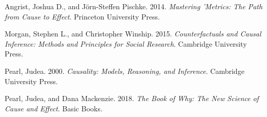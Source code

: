 \documentclass[
]{scrartcl}
\newlength{\cslhangindent}
\newenvironment{CSLReferences}[2] %
 {\begin{list}{}{%
  \setlength{\itemindent}{0pt}
  \setlength{\leftmargin}{0pt}
  \setlength{\parsep}{0pt}
  \ifodd #1
   \setlength{\leftmargin}{\cslhangindent}
   \setlength{\itemindent}{-1\cslhangindent}
  \fi
  \setlength{\itemsep}{#2\baselineskip}}}
 {\end{list}}
\begin{document}
\label{refs}
\begin{CSLReferences}{1}{0}
Angrist, Joshua D., and Jörn-Steffen Pischke. 2014. \emph{Mastering
'{Metrics}: {The Path} from {Cause} to {Effect}}. Princeton University
Press.

Morgan, Stephen L., and Christopher Winship. 2015. \emph{Counterfactuals
and {Causal Inference}: {Methods} and {Principles} for {Social
Research}}. Cambridge University Press.

Pearl, Judea. 2000. \emph{Causality: {Models}, {Reasoning}, and
{Inference}}. Cambridge University Press.

Pearl, Judea, and Dana Mackenzie. 2018. \emph{The {Book} of {Why}: {The
New Science} of {Cause} and {Effect}}. Basic Books.

\end{CSLReferences}
\end{document}
